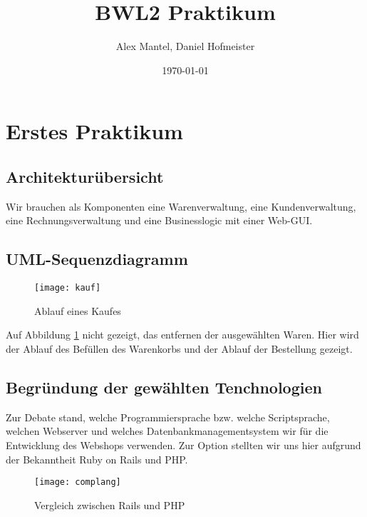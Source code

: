 \documentclass[pdftex,10pt,a4paper]{article}
\begin{document}
\title{BWL2 Praktikum}
\author{Alex Mantel, Daniel Hofmeister}
\date{\today}
\maketitle
\newpage

\tableofcontents
\newpage


\section{Erstes Praktikum}
\subsection{Architektur\"ubersicht}
Wir brauchen als Komponenten eine Warenverwaltung, eine Kundenverwaltung, eine Rechnungsverwaltung und eine Businesslogic mit einer Web-GUI.

\subsection{UML-Sequenzdiagramm}
\begin{figure}[h]
	\caption{Ablauf eines Kaufes}
	\label{fig:kauf}
	\texttt{[image: kauf]}
\end{figure}				
Auf Abbildung \ref{fig:kauf} nicht gezeigt, das entfernen der ausgew\"ahlten Waren. Hier wird der Ablauf des Bef\"ullen des Warenkorbs und der Ablauf der Bestellung gezeigt.

\subsection{Begr\"undung der gew\"ahlten Tenchnologien}
Zur Debate stand, welche Programmiersprache bzw. welche Scriptsprache, welchen Webserver und welches Datenbankmanagementsystem wir f\"ur die Entwicklung des Webshops verwenden. Zur Option stellten wir uns hier aufgrund der Bekanntheit Ruby on Rails und PHP.

\begin{figure}[h]
	\caption{Vergleich zwischen Rails und PHP}
	\cite{tbray}
	\label{fig:vergleich}
	\texttt{[image: complang]}
\end{figure}
\end{document}
